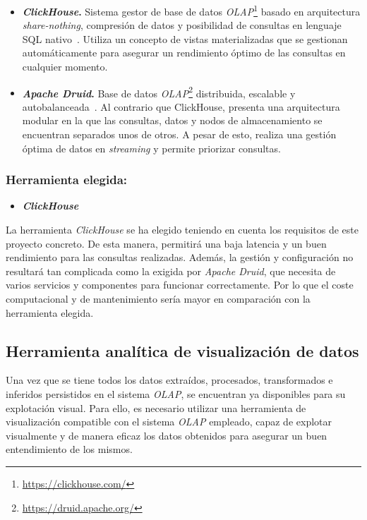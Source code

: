 \begin{itemize}
    \item \textbf{\textit{ClickHouse}.} Sistema gestor de base de datos \textit{OLAP}\footnote{\url{https://clickhouse.com/}} basado en arquitectura \textit{share-nothing}, compresión de datos y posibilidad de consultas en lenguaje SQL nativo~\cite{clickhouseFeatures}. Utiliza un concepto de vistas materializadas que se gestionan automáticamente para asegurar un rendimiento óptimo de las consultas en cualquier momento.
    
    \item \textbf{\textit{Apache Druid}.} Base de datos \textit{OLAP}\footnote{\url{https://druid.apache.org/}} distribuida, escalable y autobalanceada~\cite{apacheDruid}. Al contrario que ClickHouse, presenta una arquitectura modular en la que las consultas, datos y nodos de almacenamiento se encuentran separados unos de otros. A pesar de esto, realiza una gestión óptima de datos en \textit{streaming} y permite priorizar consultas.
\end{itemize}

\subsubsection{Herramienta elegida:}

\begin{itemize}
    \item \textbf{\textit{ClickHouse}}
\end{itemize}

La herramienta \textit{ClickHouse} se ha elegido teniendo en cuenta los requisitos de este proyecto concreto. De esta manera, permitirá una baja latencia y un buen rendimiento para las consultas realizadas. Además, la gestión y configuración no resultará tan complicada como la exigida por \textit{Apache Druid}, que necesita de varios servicios y componentes para funcionar correctamente. Por lo que el coste computacional y de mantenimiento sería mayor en comparación con la herramienta elegida.

\subsection{Herramienta analítica de visualización de datos}

Una vez que se tiene todos los datos extraídos, procesados, transformados e inferidos persistidos en el sistema \textit{OLAP}, se encuentran ya disponibles para su explotación visual. Para ello, es necesario utilizar una herramienta de visualización compatible con el sistema \textit{OLAP} empleado, capaz de explotar visualmente y de manera eficaz los datos obtenidos para asegurar un buen entendimiento de los mismos.

